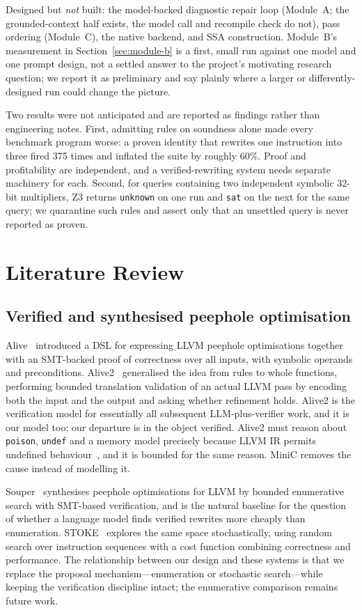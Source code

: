 \documentclass[conference]{IEEEtran}
\begin{document}
Designed but \emph{not} built: the model-backed diagnostic repair loop
(Module~A; the grounded-context half exists, the model call and recompile
check do not), pass ordering (Module~C), the native backend, and SSA
construction. Module~B's measurement in Section~\ref{sec:module-b} is a first,
small run against one model and one prompt design, not a settled answer to the
project's motivating research question; we report it as preliminary and say
plainly where a larger or differently-designed run could change the picture.

Two results were not anticipated and are reported as findings rather than
engineering notes. First, admitting rules on soundness alone made every
benchmark program worse: a proven identity that rewrites one instruction into
three fired 375 times and inflated the suite by roughly 60\%. Proof and
profitability are independent, and a verified-rewriting system needs separate
machinery for each. Second, for queries containing two independent symbolic
32-bit multipliers, Z3 returns \texttt{unknown} on one run and \texttt{sat} on
the next for the same query; we quarantine such rules and assert only that an
unsettled query is never reported as proven.

\section{Literature Review}

\subsection{Verified and synthesised peephole optimisation}

Alive~\cite{alive} introduced a DSL for expressing LLVM peephole
optimisations together with an SMT-backed proof of correctness over all inputs,
with symbolic operands and preconditions. Alive2~\cite{alive2} generalised the
idea from rules to whole functions, performing bounded translation validation
of an actual LLVM pass by encoding both the input and the output and asking
whether refinement holds. Alive2 is the verification model for essentially all
subsequent LLM-plus-verifier work, and it is our model too; our departure is in
the object verified. Alive2 must reason about \texttt{poison}, \texttt{undef}
and a memory model precisely because LLVM IR permits undefined
behaviour~\cite{smtmemory}, and it is bounded for the same reason. MiniC
removes the cause instead of modelling it.

Souper~\cite{souper} synthesises peephole optimisations for LLVM by bounded
enumerative search with SMT-based verification, and is the natural baseline for
the question of whether a language model finds verified rewrites more cheaply
than enumeration. STOKE~\cite{stoke} explores the same space stochastically,
using random search over instruction sequences with a cost function combining
correctness and performance. The relationship between our design and these
systems is that we replace the proposal mechanism---enumeration or stochastic
search---while keeping the verification discipline intact; the enumerative
comparison remains future work.
\end{document}
